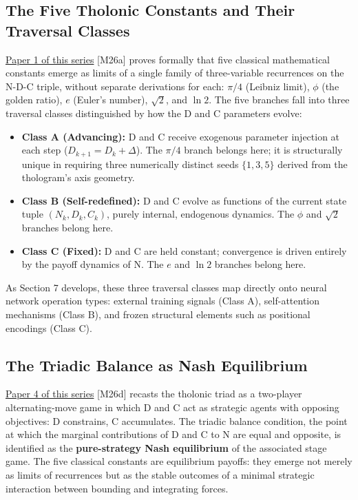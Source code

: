 \documentclass[12pt]{article}
\providecommand{\tightlist}{%
  \setlength{\itemsep}{0pt}\setlength{\parskip}{0pt}}
\begin{document}
\subsection{The Five Tholonic Constants and Their Traversal Classes}\label{the-five-tholonic-constants-and-their-traversal-classes}

\href{https://github.com/baardev/truevalue/blob/main/docnav/Research/papers/1_recursive-tholonic-five-constants/1_recursive-tholonic-five-constants.pdf}{Paper
1 of this series} {[}M26a{]} proves formally that five classical
mathematical constants emerge as limits of a single family of
three-variable recurrences on the N-D-C triple, without separate
derivations for each: \(\pi/4\) (Leibniz limit), \(\phi\) (the golden
ratio), \(e\) (Euler's number), \(\sqrt{2}\), and \(\ln 2\). The five
branches fall into three traversal classes distinguished by how the D
and C parameters evolve:

\begin{itemize}
\tightlist
\item
  \textbf{Class A (Advancing):} D and C receive exogenous parameter
  injection at each step (\(D_{k+1} = D_k + \Delta\)). The \(\pi/4\)
  branch belongs here; it is structurally unique in requiring three
  numerically distinct seeds \(\{1, 3, 5\}\) derived from the
  thologram's axis geometry.
\item
  \textbf{Class B (Self-redefined):} D and C evolve as functions of the
  current state tuple \((N_k, D_k, C_k)\), purely internal, endogenous
  dynamics. The \(\phi\) and \(\sqrt{2}\) branches belong here.
\item
  \textbf{Class C (Fixed):} D and C are held constant; convergence is
  driven entirely by the payoff dynamics of N. The \(e\) and \(\ln 2\)
  branches belong here.
\end{itemize}

As Section 7 develops, these three traversal classes map directly onto
neural network operation types: external training signals (Class A),
self-attention mechanisms (Class B), and frozen structural elements such
as positional encodings (Class C).

\subsection{The Triadic Balance as Nash Equilibrium}\label{the-triadic-balance-as-nash-equilibrium}

\href{https://github.com/baardev/truevalue/blob/main/docnav/Research/papers/4_game-theoretic-triadic-balance/4_game-theoretic-triadic-balance.pdf}{Paper
4 of this series} {[}M26d{]} recasts the tholonic triad as a two-player
alternating-move game in which D and C act as strategic agents with
opposing objectives: D constrains, C accumulates. The triadic balance
condition, the point at which the marginal contributions of D and C to N
are equal and opposite, is identified as the \textbf{pure-strategy Nash
equilibrium} of the associated stage game. The five classical constants
are equilibrium payoffs: they emerge not merely as limits of recurrences
but as the stable outcomes of a minimal strategic interaction between
bounding and integrating forces.
\end{document}
